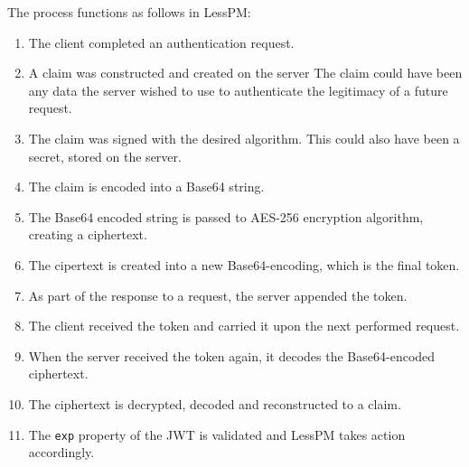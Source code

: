 The process functions as follows in LessPM:
\begin{enumerate}
  \item The client completed an authentication request.
  \item A claim was constructed and created on the server
  The claim could have been any data the server wished to use to authenticate
  the legitimacy of a future request.
  \item The claim was signed with the desired algorithm.
  This could also have been a secret, stored on the server.
  \item The claim is encoded into a Base64 string.
  \item The Base64 encoded string is passed to AES-256 encryption algorithm,
  creating a ciphertext.
  \item The cipertext is created into a new Base64-encoding, which is the
  final token.
  \item As part of the response to a request, the server appended the
  token.
  \item The client received the token and carried it upon the next performed
  request.
  \item When the server received the token again, it decodes the
  Base64-encoded ciphertext.
  \item The ciphertext is decrypted, decoded and reconstructed to a claim.
  \item The \texttt{exp} property of the JWT is validated and LessPM takes
  action accordingly.
\end{enumerate}


